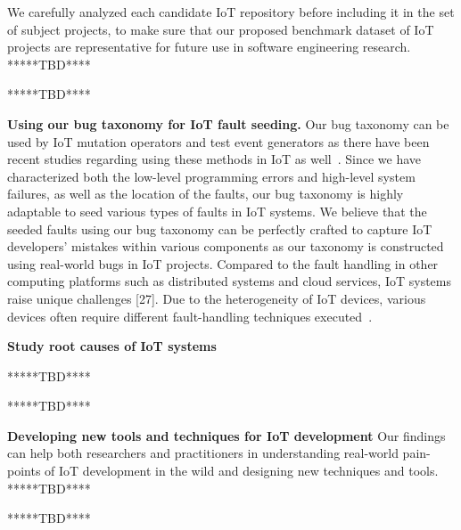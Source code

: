  We carefully analyzed each candidate IoT repository before including it in the set of subject projects, to make sure that our proposed benchmark dataset of IoT projects are representative for future use in software engineering research.
 *****TBD****

*****TBD****


 \textbf{Using our bug taxonomy for IoT fault seeding.}
Our bug taxonomy can be used by IoT mutation operators and test event generators as there have been recent studies regarding using these methods in IoT as well~\cite{gutierrez2019evolutionary,gutierrez2018iot}. Since we have characterized both the low-level programming errors and high-level system failures, as well as the location of the faults, our bug taxonomy is highly adaptable to seed various types of faults in IoT systems. We believe that the seeded faults using our bug taxonomy can be perfectly crafted to capture IoT developers' mistakes within various components as our taxonomy is constructed using real-world bugs in IoT projects. Compared to the fault handling in other computing platforms such as distributed systems and cloud services, IoT systems raise unique challenges [27]. Due to the heterogeneity of IoT devices, various devices often require different fault-handling techniques executed~\cite{norris2020iotrepair}.

 \textbf{Study root causes of IoT systems}

*****TBD****

*****TBD****

 \textbf{Developing new tools and techniques for IoT development}
 Our findings can help both researchers and practitioners in understanding real-world pain-points of IoT development in the wild and designing new techniques and tools. 
 *****TBD****

*****TBD****


\endinput

